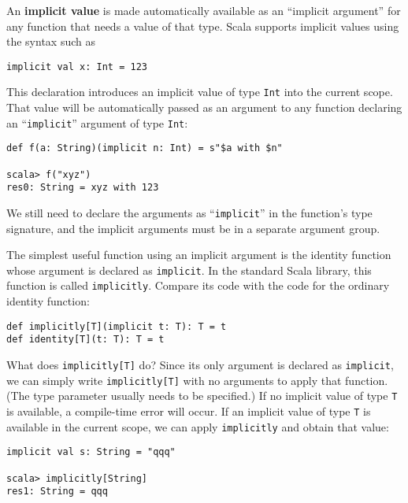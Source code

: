 An \textbf{implicit value} is made automatically
available as an ``implicit argument'' for any function that needs
a value of that type. Scala supports implicit values using the syntax
such as
\begin{lstlisting}
implicit val x: Int = 123
\end{lstlisting}
This declaration introduces an implicit value of type \lstinline!Int!
into the current scope. That value will be automatically passed as
an argument to any function declaring an ``\lstinline!implicit!''
argument of type \lstinline!Int!:
\begin{lstlisting}
def f(a: String)(implicit n: Int) = s"$a with $n"

scala> f("xyz")
res0: String = xyz with 123
\end{lstlisting}
We still need to declare the arguments as ``\lstinline!implicit!''
in the function's type signature, and the implicit arguments must
be in a separate argument group.

The simplest useful function using an implicit argument is the identity
function whose argument is declared as \lstinline!implicit!. In the
standard Scala library, this function is called \lstinline!implicitly!.
Compare its code with the code for the ordinary identity function:
\begin{lstlisting}
def implicitly[T](implicit t: T): T = t
def identity[T](t: T): T = t
\end{lstlisting}
What does \lstinline!implicitly[T]! do? Since its only argument is
declared as \lstinline!implicit!, we can simply write \lstinline!implicitly[T]!
with no arguments to apply that function. (The type parameter usually
needs to be specified.) If no implicit value of type \lstinline!T!
is available, a compile-time error will occur. If an implicit value
of type \lstinline!T! is available in the current scope, we can apply
\lstinline!implicitly! and obtain that value:
\begin{lstlisting}
implicit val s: String = "qqq"

scala> implicitly[String]
res1: String = qqq
\end{lstlisting}

